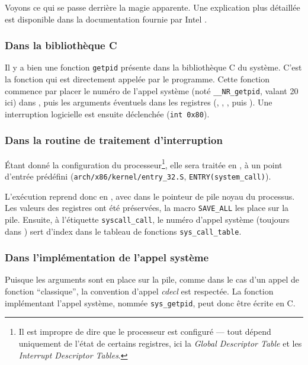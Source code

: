 Voyons ce qui se passe derrière la magie apparente. Une explication plus
détaillée est disponible dans la documentation fournie par Intel
\cite{intelsys}.

\subsubsection{Dans la bibliothèque C}

Il y a bien une fonction \texttt{getpid} présente dans la bibliothèque C du
système. C'est la fonction qui est directement appelée par le programme. Cette
fonction commence par placer le numéro de l'appel système (noté
\texttt{\_\_NR\_getpid}, valant 20 ici) dans \eax, puis les arguments éventuels
dans les registres (\ebx, \ecx, \edx, \esi puis \edi). Une interruption
logicielle est ensuite déclenchée (\texttt{int 0x80}).

\subsubsection{Dans la routine de traitement d'interruption}

Étant donné la configuration du processeur\footnote{Il est impropre de dire que
le processeur est configuré --- tout dépend uniquement de l'état de certains
registres, ici la \emph{Global Descriptor Table} et les \emph{Interrupt
Descriptor Tables}.}, elle sera traitée en , à un point d'entrée
prédéfini (\texttt{arch/x86/kernel/entry\_32.S}, \texttt{ENTRY(system\_call)}).


L'exécution reprend donc en , avec dans \esp le pointeur de pile noyau
du processus. Les valeurs des registres ont été préservées, la macro
\texttt{SAVE\_ALL} les place sur la pile. Ensuite, à l'étiquette
\texttt{syscall\_call}, le numéro d'appel système (toujours dans \eax) sert
d'index dans le tableau de fonctions \texttt{sys\_call\_table}.


\subsubsection{Dans l'implémentation de l'appel système}

Puisque les arguments sont en place sur la pile, comme dans le cas d'un appel de
fonction ``classique'', la convention d'appel \emph{cdecl} est respectée. La
fonction implémentant l'appel système, nommée \texttt{sys\_getpid}, peut donc
être écrite en C.

